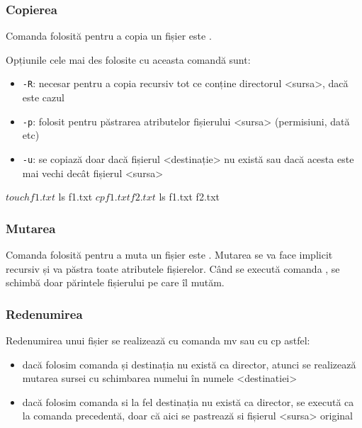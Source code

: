 \subsubsection{Copierea}
Comanda folosită pentru a copia un fișier este .

Opțiunile cele mai des folosite cu aceasta comandă sunt:

\begin{itemize}
	\item \texttt{-R}: necesar pentru a copia recursiv tot ce conține
		directorul <sursa>, dacă este cazul
	\item \texttt{-p}: folosit pentru păstrarea atributelor fișierului <sursa>
		(permisiuni, dată etc)
	\item \texttt{-u}: se copiază doar dacă fișierul <destinație> nu există sau
		dacă acesta este mai vechi decât fișierul <sursa>
\end{itemize}

\begin{screen}
$ touch f1.txt
$ ls
f1.txt
$ cp f1.txt f2.txt
$ ls
f1.txt  f2.txt
\end{screen}
\subsubsection{Mutarea}

Comanda folosită pentru a muta un fișier este . Mutarea se va face implicit recursiv și va păstra toate
atributele fișierelor. Când se execută  comanda , se schimbă doar
părintele fișierului pe care îl mutăm.


\subsubsection{Redenumirea}

Redenumirea unui fișier se realizează cu comanda mv sau cu cp astfel:

\begin{itemize}
	\item dacă folosim comanda  și destinația
		nu există ca director, atunci se realizează mutarea sursei cu
		schimbarea numelui în numele <destinatiei>
	\item dacă folosim comanda  si la fel
		destinația nu există ca director, se execută ca la comanda
		precedentă, doar că aici se pastrează si fișierul <sursa>
		original
\end{itemize}

